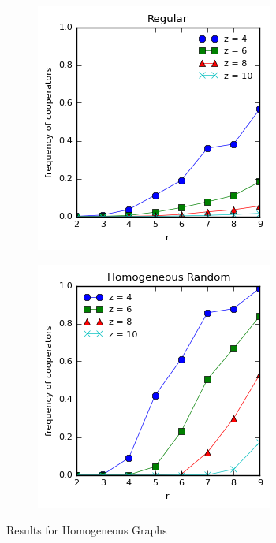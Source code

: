 \documentclass{article}
\begin{document}
	\begin{figure}[h]
		\centering
		\begin{subfigure}[b]{0.4\textwidth}
			\includegraphics[width=\textwidth]{fig/fixed/regular.png}
			\caption{}
		\end{subfigure}
		\begin{subfigure}[b]{0.4\textwidth}
			\includegraphics[width=\textwidth]{fig/fixed/homorand.png}
			\caption{}
		\end{subfigure}
		\caption{Results for Homogeneous Graphs}
		\label{fig:homographs}
	\end{figure}
\end{document}
